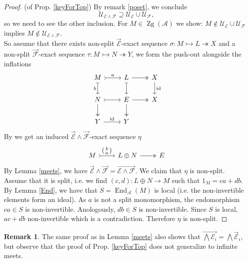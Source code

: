 \documentclass[11pt,a4paper]{amsart}
\theoremstyle{plain}
\theoremstyle{definition}
\newtheorem{rem}[thm]{Remark}
\DeclareMathOperator{\End}{End}
\newcommand{\defl}{\twoheadrightarrow}
\newcommand{\infl}{\rightarrowtail}
\newcommand{\mcA}{\mathcal{A}}
\newcommand{\mcE}{\mathcal{E}}
\newcommand{\mcF}{\mathcal{F}}
\newcommand{\mcU}{\mathcal{U}}
\DeclareMathOperator{\Zg}{Zg}
\begin{document}
\begin{proof} (of Prop. \ref{keyForTop})
By remark \ref{poset}, we conclude 
\[\mcU_{\mcE\wedge \mcF} \supseteq \mcU_{\mcE}\cup \mcU_{\mcF}, \]
so we need to see the other inclusion. For $M\in \Zg(\mcA)$ we show: $M \notin \mcU_{\mcE}\cup \mcU_{\mcF}$ implies $M\notin \mcU_{\mcE\wedge \mcF}$.\\
So assume that there exists non-split $\overrightarrow{\mcE}$-exact sequence $\sigma\colon M \infl L \defl X$ and a non-split $\overrightarrow{\mcF}$-exact sequence $\tau\colon M \infl N \defl Y$, we form the push-out alongside the inflations 
\[
\begin{tikzcd}
M \arrow[r, "a", tail] \arrow[d, "b"', tail]          & L \arrow[d, tail] \arrow[r, two heads]      & X \arrow[d, "\rm{id}"] \\
N \arrow[r, tail] \arrow[d, two heads]                & E \arrow[r, two heads] \arrow[d, two heads] & X                      \\
Y \arrow[r, phantom, shift left] \arrow[r, "\rm{id}"] & Y                                           &                       
\end{tikzcd}
\]
By \cite[Prop. 2.12]{Bue} we get an induced $\overrightarrow{\mcE}\wedge\overrightarrow{\mcF}$-exact sequence $\eta$
\[
\begin{tikzcd}
M \arrow[r, "\left(\begin{smallmatrix}b \\a\end{smallmatrix}\right)", tail] & L\oplus N \arrow[r, two heads] & E
\end{tikzcd}
\]
By Lemma \ref{meets}, we have $\overrightarrow{\mcE}\wedge\overrightarrow{\mcF}=\overrightarrow{\mcE\wedge \mcF}$. We claim that $\eta$ is non-split. Assume that it is split, i.e. we find $(c, d)\colon L \oplus N \to M$ such that 
$1_M=ca+db$. By Lemma \ref{End}, we have that $S=\End_{\mcA} (M)$ is local (i.e. the non-invertible elements form an ideal). As $a$ is not a split monomorphism, the endomorphism $ca\in S$ is non-invertible. Anologously, $db\in S$ is non-invertible. Since $S$ is local, $ac+db$ non-invertible which is a contradiction. Therefore $\eta $ is non-split. 
\end{proof}

\begin{rem}
The same proof as in Lemma \ref{meets} also shows that $\overrightarrow{\bigwedge \mcE_i}=\bigwedge \overrightarrow{\mcE}_i$, but observe that the proof of Prop. \ref{keyForTop} does not generalize to infinite meets.  
\end{rem}
\end{document}
